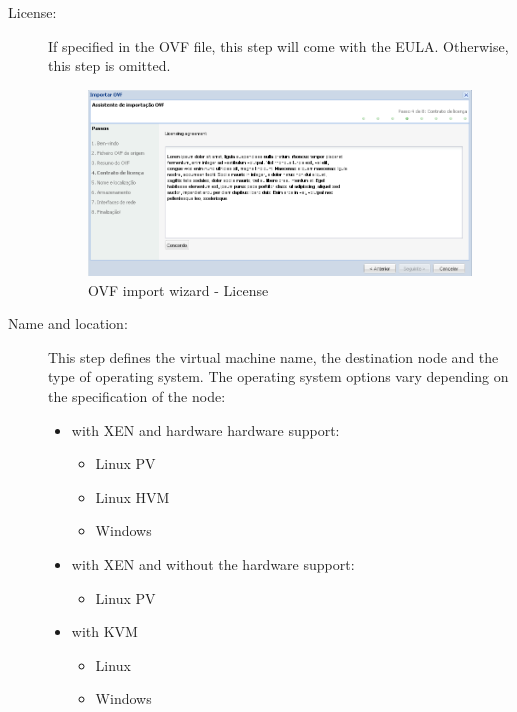\begin{description}
    \item[License:] If specified in the OVF file, this step will come with the EULA. Otherwise, this step is omitted.
		\begin{figure}[H]
            \begin{center}
            \includegraphics[scale=0.5]{screenshots/ovf_import_eula.png}
            \caption{OVF import wizard - License}
            \label{fig:ovf_import_eula}
            \end{center}
        \end{figure}

    \item[Name and location:] This step defines the virtual machine name, the destination node and the type of operating system. The operating system options vary depending on the specification of the node:
		\begin{itemize}
			\item with XEN and hardware hardware support:
			\begin{itemize}
				\item Linux PV
				\item Linux HVM
				\item Windows
			\end{itemize}
 			\item with XEN and without the hardware support:
			\begin{itemize}
				\item Linux PV
			\end{itemize}
 			\item with KVM
			\begin{itemize}
				\item Linux
				\item Windows
			\end{itemize}
		\end{itemize}


\end{description}
